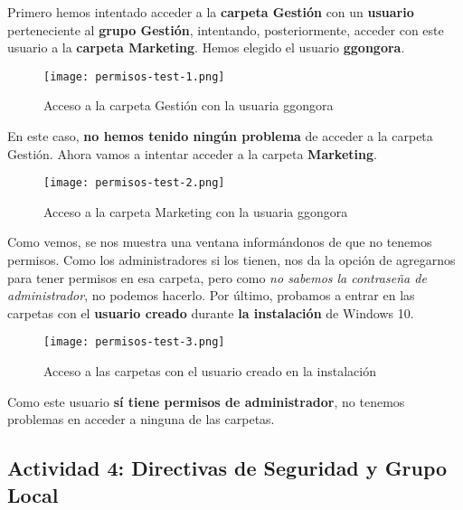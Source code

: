 \begin{enumerate}
   Primero hemos intentado acceder a la \textbf{carpeta Gestión} con un \textbf{usuario} perteneciente al \textbf{grupo Gestión}, intentando, posteriormente, acceder con este usuario a la \textbf{carpeta Marketing}. Hemos elegido el usuario \textbf{ggongora}.

   \begin{figure}[H]
       \centering
       \texttt{[image: permisos-test-1.png]}
       \caption{Acceso a la carpeta Gestión con la usuaria ggongora}
   \end{figure}

    En este caso, \textbf{no hemos tenido ningún problema} de acceder a la carpeta Gestión. Ahora vamos a intentar acceder a la carpeta \textbf{Marketing}.

    \begin{figure}[H]
        \centering
        \texttt{[image: permisos-test-2.png]}
        \caption{Acceso a la carpeta Marketing con la usuaria ggongora}
    \end{figure}

    Como vemos, se nos muestra una ventana informándonos de que no tenemos permisos. Como los administradores si los tienen, nos da la opción de agregarnos para tener permisos en esa carpeta, pero como \textit{no sabemos la contraseña de administrador}, no podemos hacerlo. Por último, probamos a entrar en las carpetas con el \textbf{usuario creado} durante \textbf{la instalación} de Windows 10.

   \begin{figure}[H]
        \centering
        \texttt{[image: permisos-test-3.png]}
        \caption{Acceso a las carpetas con el usuario creado en la instalación}
    \end{figure}

    Como este usuario \textbf{sí tiene permisos de administrador}, no tenemos problemas en acceder a ninguna de las carpetas.
\end{enumerate}

\subsection{Actividad 4: Directivas de Seguridad y Grupo Local}

